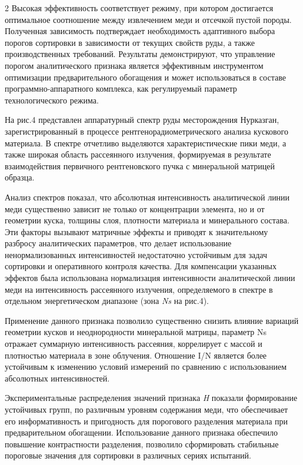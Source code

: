 \begin{multicols}{2}
Высокая эффективность соответствует режиму, при котором достигается
оптимальное соотношение между извлечением меди и отсечкой пустой породы.
Полученная зависимость подтверждает необходимость адаптивного выбора
порогов сортировки в зависимости от текущих свойств руды, а также
производственных требований. Результаты демонстрируют, что управление
порогом аналитического признака является эффективным инструментом
оптимизации предварительного обогащения и может использоваться в составе
программно-аппаратного комплекса, как регулируемый параметр
технологического режима.

На рис.4 представлен аппаратурный спектр руды месторождения Нурказган,
зарегистрированный в процессе рентгенорадиометрического анализа
кускового материала. В спектре отчетливо выделяются характеристические
пики меди, а также широкая область рассеянного излучения, формируемая в
результате взаимодействия первичного рентгеновского пучка с минеральной
матрицей образца.

Анализ спектров показал, что абсолютная интенсивность аналитической
линии меди существенно зависит не только от концентрации элемента, но и
от геометрии куска, толщины слоя, плотности материала и минерального
состава. Эти факторы вызывают матричные эффекты и приводят к
значительному разбросу аналитических параметров, что делает
использование ненормализованных интенсивностей недостаточно устойчивым
для задач сортировки и оперативного контроля качества. Для компенсации
указанных эффектов была использована нормализация интенсивности
аналитической линии меди на интенсивность рассеянного излучения,
определяемого в спектре в отдельном энергетическом диапазоне (зона
\emph{Ns} на рис.4).

Применение данного признака позволило существенно снизить влияние
вариаций геометрии кусков и неоднородности минеральной матрицы, параметр
Ns отражает суммарную интенсивность рассеяния, коррелирует с массой и
плотностью материала в зоне облучения. Отношение
I/N является более
устойчивым к изменению условий измерений по сравнению с использованием
абсолютных интенсивностей.

Экспериментальные распределения значений признака \emph{H} показали
формирование устойчивых групп, по различным уровням содержания меди, что
обеспечивает его информативность и пригодность для порогового разделения
материала при предварительном обогащении. Использование данного признака
обеспечило повышение контрастности разделения, позволило сформировать
стабильные пороговые значения для сортировки в различных сериях
испытаний.


\end{multicols}
